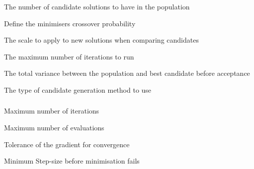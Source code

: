  {The number of candidate solutions to have in the population}

 {Define the minimisers crossover probability}

 {The scale to apply to new solutions when comparing candidates}

 {The maximum number of iterations to run}

 {The total variance between the population and best candidate before acceptance}

 {The type of candidate generation method to use}

\subsubsection[D Lib]{}

\subsubsection[Gamma Diff]{}

 {Maximum number of iterations}

 {Maximum number of evaluations}

 {Tolerance of the gradient for convergence}

 {Minimum Step-size before minimisation fails}

